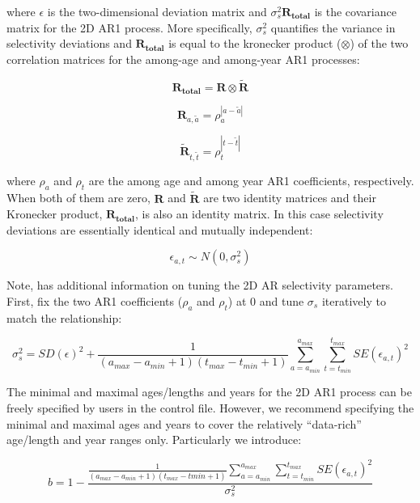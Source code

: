 where $\epsilon$ is the two-dimensional deviation matrix and $\sigma_s^2\mathbf{R_{total}}$ is the covariance matrix for the 2D AR1 process. More specifically, $\sigma_s^2$ quantifies the variance in selectivity deviations and $\mathbf{R_{total}}$ is equal to the kronecker product ($\otimes$) of the two correlation matrices for the among-age and among-year AR1 processes:

\begin{equation}
\mathbf{R_{total}}=\mathbf{R}\otimes\mathbf{\tilde{R}}
\end{equation}

\begin{equation}
\mathbf{R}_{a,\tilde{a}}=\rho_a^{|a-\tilde{a}|}
\end{equation}

\begin{equation}
\mathbf{\tilde{R}}_{t,\tilde{t}}=\rho_t^{|t-\tilde{t}|}
\end{equation}

where $\rho_a$ and $\rho_t$ are the among age and among year AR1 coefficients, respectively. When both of them are zero, $\mathbf{R}$ and $\mathbf{\tilde{R}}$ are two identity matrices and their Kronecker product, $\mathbf{R_{total}}$, is also an identity matrix. In this case selectivity deviations are essentially identical and mutually independent:

\begin{equation}
\epsilon_{a,t}\sim N(0,\sigma_s^2)
\end{equation} 

Note, \citet{xu-new-2019} has additional information on tuning the 2D AR selectivity parameters. First, fix the two AR1 coefficients ($\rho_a$ and $\rho_t$) at 0 and tune $\sigma_s$ iteratively to match the relationship:

\begin{equation}
\sigma_s^2=SD(\epsilon)^2+\frac{1}{(a_{max}-a_{min}+1)(t_{max}-t_{min}+1)}\sum_{a=a_{min}}^{a_{max}}\sum_{t=t_{min}}^{t_{max}}SE(\epsilon_{a,t})^2
\end{equation}

The minimal and maximal ages/lengths and years for the 2D AR1 process can be freely specified by users in the control file. However, we recommend specifying the minimal and maximal ages and years to cover the relatively ``data-rich'' age/length and year ranges only. Particularly we introduce: 

\begin{equation}
b=1-\frac{\frac{1}{(a_{max}-a_{min}+1)(t_{max}-t{min}+1)}\sum_{a=a_{min}}^{a_{max}}\sum_{t=t_{min}}^{t_{max}}SE(\epsilon_{a,t})^2}{\sigma_s^2}
\end{equation}


